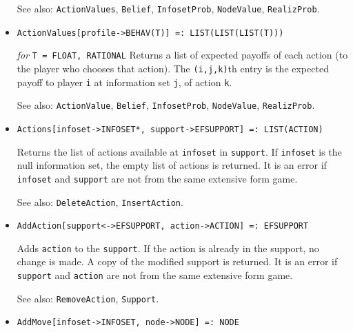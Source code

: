 \begin{itemize}
\item [See also:] \verb+ActionValues+, \verb+Belief+,
\verb+InfosetProb+, \verb+NodeValue+, \verb+RealizProb+.  
\ed

\item{}
\protect \large \begin{verbatim}
ActionValues[profile->BEHAV(T)] =: LIST(LIST(LIST(T))) 
\end{verbatim}\normalsize

{\it for} {\tt T = FLOAT, RATIONAL}
\bd 
Returns a list of expected payoffs of each action (to the player who
chooses that action).  The \verb+(i,j,k)+th entry is the expected
payoff to player \verb+i+ at information set \verb+j+, of action \verb+k+. 

\item [See also:] \verb+ActionValue+, \verb+Belief+,
\verb+InfosetProb+, \verb+NodeValue+, \verb+RealizProb+.  
\ed

\item{}
\protect \large \begin{verbatim} 
Actions[infoset->INFOSET*, support->EFSUPPORT] =: LIST(ACTION)
\end{verbatim}\normalsize

\bd
Returns the list of actions available at \verb+infoset+ in
\verb+support+.  If \verb+infoset+ is the null information set, the
empty list of actions is returned.  It is an error if \verb+infoset+
and \verb+support+ are not from the same extensive form game.

\item [See also:] \verb+DeleteAction+, \verb+InsertAction+.
\ed

\item{}
\protect \large \begin{verbatim} 
AddAction[support<->EFSUPPORT, action->ACTION] =: EFSUPPORT
\end{verbatim}\normalsize

\bd 
Adds \verb+action+ to the \verb+support+.  If the action is already in
the support, no change is made.  A copy of the modified support is
returned.  It is an error if \verb+support+ and \verb+action+ are not from the
same extensive form game.

\item [See also:] \verb+RemoveAction+, \verb+Support+.
\ed

\item{}
\protect \large \begin{verbatim} 
AddMove[infoset->INFOSET, node->NODE] =: NODE
\end{verbatim}\normalsize


\end{itemize}
